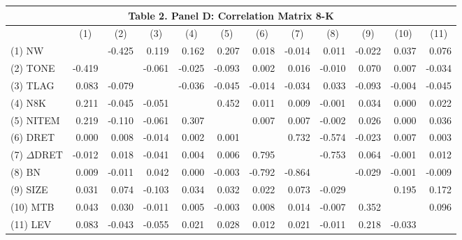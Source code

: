 \begin{table}[H] \label{T2PD}
  \centering
    \begin{tabular}{lrrrrrrrrrrr}
    \multicolumn{12}{c}{\textbf{Table 2. Panel D: Correlation Matrix 8-K}} \\
    \midrule
      & \multicolumn{1}{c}{(1)} & \multicolumn{1}{c}{(2)} & \multicolumn{1}{c}{(3)} & \multicolumn{1}{c}{(4)} & \multicolumn{1}{c}{(5)} & \multicolumn{1}{c}{(6)} & \multicolumn{1}{c}{(7)} & \multicolumn{1}{c}{(8)} & \multicolumn{1}{c}{(9)} & \multicolumn{1}{c}{(10)} & \multicolumn{1}{c}{(11)} \\
    \midrule
    (1) NW &  & -0.425 & 0.119 & 0.162 & 0.207 & 0.018 & -0.014 & 0.011 & -0.022 & 0.037 & 0.076 \\
    (2) TONE & -0.419 & & -0.061 & -0.025 & -0.093 & 0.002 & 0.016 & -0.010 & 0.070 & 0.007 & -0.034 \\
    (3) TLAG & 0.083 & -0.079 &  & -0.036 & -0.045 & -0.014 & -0.034 & 0.033 & -0.093 & -0.004 & -0.045 \\
    (4) N8K & 0.211 & -0.045 & -0.051 & & 0.452 & 0.011 & 0.009 & -0.001 & 0.034 & 0.000 & 0.022 \\
    (5) NITEM & 0.219 & -0.110 & -0.061 & 0.307 & & 0.007 & 0.007 & -0.002 & 0.026 & 0.000 & 0.036 \\
    (6) DRET & 0.000 & 0.008 & -0.014 & 0.002 & 0.001 & & 0.732 & -0.574 & -0.023 & 0.007 & 0.003 \\
    (7) $\Delta$DRET & -0.012 & 0.018 & -0.041 & 0.004 & 0.006 & 0.795 & & -0.753 & 0.064 & -0.001 & 0.012 \\
    (8) BN & 0.009 & -0.011 & 0.042 & 0.000 & -0.003 & -0.792 & -0.864 & & -0.029 & -0.001 & -0.009 \\
    (9) SIZE & 0.031 & 0.074 & -0.103 & 0.034 & 0.032 & 0.022 & 0.073 & -0.029 &  & 0.195 & 0.172 \\
    (10) MTB & 0.043 & 0.030 & -0.011 & 0.005 & -0.003 & 0.008 & 0.014 & -0.007 & 0.352 &  & 0.096 \\
    (11) LEV & 0.083 & -0.043 & -0.055 & 0.021 & 0.028 & 0.012 & 0.021 & -0.011 & 0.218 & -0.033 & \\
    \bottomrule
    \end{tabular}%
  \label{tab:addlabel}%
\end{table}%
